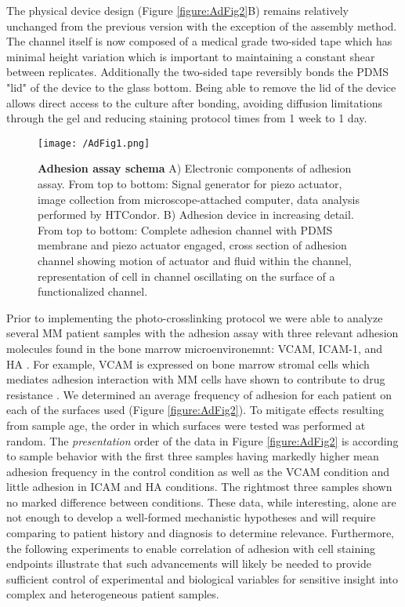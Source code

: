 The physical device design (Figure \ref{figure:AdFig2}B) remains relatively unchanged from the previous version with the exception of the assembly method. The channel itself is now composed of a medical grade two-sided tape which has minimal height variation which is important to maintaining a constant shear between replicates. Additionally the two-sided tape reversibly bonds the PDMS "lid" of the device to the glass bottom. Being able to remove the lid of the device allows direct access to the culture after bonding, avoiding diffusion limitations through the gel and reducing staining protocol times from 1 week to 1 day. 


\begin{figure}[ht] %
\centering
\texttt{[image: /AdFig1.png]}
\caption[\textbf{Adhesion assay schema}]{\textbf{Adhesion assay schema} A) Electronic components of adhesion assay. From top to bottom: Signal generator for piezo actuator, image collection from microscope-attached computer, data analysis performed by HTCondor. B) Adhesion device in increasing detail. From top to bottom: Complete adhesion channel with PDMS membrane and piezo actuator engaged, cross section of adhesion channel showing motion of actuator and fluid within the channel, representation of cell in channel oscillating on the surface of a functionalized channel.}
\label{figure:AdFig1}
\end{figure}

Prior to implementing the photo-crosslinking protocol we were able to analyze several MM patient samples with the adhesion assay with three relevant adhesion molecules found in the bone marrow microenvironemnt: VCAM, ICAM-1, and HA \cite{Hideshima2001, Damiano2000, Vincent2005, Reagan2012, Balakumaran2010, Ohwada2008, Vincent2005}. For example, VCAM is expressed on bone marrow stromal cells which mediates adhesion interaction with MM cells have shown to contribute to drug resistance \cite{Simmons1992}. We determined an average frequency of adhesion for each patient on each of the surfaces used (Figure \ref{figure:AdFig2}). To mitigate effects resulting from sample age, the order in which surfaces were tested was performed at random. The \emph{presentation} order of the data in Figure \ref{figure:AdFig2} is according to sample behavior with the first three samples having markedly higher mean adhesion frequency in the control condition as well as the VCAM condition and little adhesion in ICAM and HA conditions. The rightmost three samples shown no marked difference between conditions. These data, while interesting, alone are not enough to develop a well-formed mechanistic hypotheses and will require comparing to patient history and diagnosis to determine relevance. Furthermore, the following experiments to enable correlation of adhesion with cell staining endpoints illustrate that such advancements will likely be needed to provide sufficient control of experimental and biological variables for sensitive insight into complex and heterogeneous patient samples.

